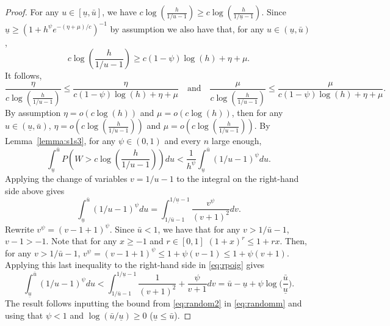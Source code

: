 \documentclass[
  12pt]{article}
\newtheorem{lem}[thm]{\textsc{Lemma}}
\begin{document}
\begin{proof}
For any $u\in [\underline{u},\bar{u}]$, we have $c\log \left(\frac{h}{1 / u-1}\right) \geq c\log \left(\frac{h}{1 / \underline{u}-1}\right)$. Since $\underline{u}\geq (1+h^{\psi}e^{-(\eta+\mu)/c})^{-1}$ by assumption  we also have that, for any $u\in (\underline{u},\bar{u})$,
$$c\log \left(\frac{h}{1 / u-1}\right) \geq c(1-\psi)\log(h)+\eta+\mu.$$
It follows,
$$\frac{\eta}{c\log \left(\frac{h}{1 / u-1}\right)}\leq \frac{\eta}{c(1-\psi)\log(h)+\eta+\mu}
\quad\text{and}\quad
\frac{\mu}{c\log \left(\frac{h}{1 / u-1}\right)}\leq\frac{\mu}{ c(1-\psi)\log(h)+\eta+\mu}.$$
By assumption $\eta=o\left(c\log (h)\right)$ and $\mu=o\left(c\log (h)\right)$, then for any $u\in (\underline{u},\bar{u})$, $\eta=o\left(c\log \left(\frac{h}{1 / u-1}\right)\right)$ and $\mu=o\left(c\log \left(\frac{h}{1 / u-1}\right)\right)$. By Lemma~\ref{lemma:s1s3}, for any $\psi\in(0,1)$ and every $n$ large enough,
\begin{equation}\label{eq:randomm}
    \int_{\underline{u}}^{\bar{u}} P\left(W>c\log \left(\frac{h}{1 / u-1}\right)\right) d u< \frac{1}{h^{\psi}} \int_{\underline{u}}^{\bar{u}}(1 / u-1)^{\psi} d u .
\end{equation}
Applying the change of variables $v=1 / u-1$ to the integral on the right-hand side above gives
\begin{equation}\label{eq:rpoig}
    \int_{\underline{u}}^{\bar{u}}(1 / u-1)^{\psi} d u=\int_{1 / \bar{u}-1}^{1 / \underline{u}-1} \frac{v^{\psi}}{(v+1)^2} d v.
\end{equation}
Rewrite $v^{\psi}=(v-1 + 1)^{\psi}$. Since $\bar{u}<1$, we have that for any $v>1 / \bar{u}-1$, $v-1>-1$. Note that for any $x \geq-1$ and $r\in[0,1]$ $(1+x)^r \leq 1+r x$. Then, for any $v>1 / \bar{u}-1$, $v^{\psi}=(v-1 + 1)^{\psi}\leq 1 + \psi (v-1)\leq 1 + \psi(v+1)$. Applying this last inequality to the right-hand side in \eqref{eq:rpoig} gives
\begin{equation}\label{eq:random2}
\int_{\underline{u}}^{\bar{u}}(1 / u-1)^{\psi} d u<\int_{1 / \bar{u}-1}^{1 / \underline{u}-1} \frac{1}{(v+1)^2} +\frac{\psi}{v+1} d v = \bar{u}-\underline{u}+\psi\log\Big(\frac{\bar{u}}{\underline{u}}\Big).
\end{equation}
The result follows inputting the bound from \eqref{eq:random2} in \eqref{eq:randomm} and using that $\psi<1$ and $\log(\bar{u}/\underline{u}) \geq 0$ ($\underline{u} \leq \bar{u}$).
\end{proof}


\end{document}
